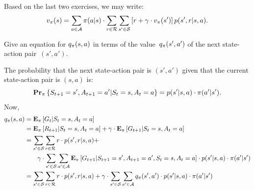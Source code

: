Based on the last two exercises, we may write:
\begin{equation}
    v_{\pi} (s) = \sum_{a \in \mathcal{A}} \pi (a \vert s) \cdot 
            \sum_{r \in \mathcal{R}} \sum_{s' \in \mathcal{S}} \left [ r + \gamma \cdot v_{\pi}(s') \right ] p(s', r \vert s, a).
\end{equation}

\begin{exer}
Give an equation for $q_{\pi} (s, a)$ in terms of the 
value~$q_{\pi} (s', a')$ of the next state-action pair~$(s', a')$. 
\end{exer}
\begin{solution}
The probability that the next state-action pair is $(s', a')$ given 
that the current state-action pair is $(s, a)$ is:
\[
    \mathbf{Pr}_{\pi} \left \{ S_{t + 1} = s', A_{t + 1} = a' \vert S_t = s, A_t = a \right \}
    = p(s' \vert s, a) \cdot \pi (a' \vert s').
\]
Now,
\begin{align*}
    q_{\pi} (s, a) & = \mathbf{E}_{\pi} \left [ G_t \vert S_t = s, A_t = a \right ] \\
                       & = \mathbf{E}_{\pi} \left [ R_{t + 1} \vert S_t = s, A_t = a \right ] + 
                           \gamma \cdot \mathbf{E}_{\pi} \left [ G_{t + 1} \vert S_t = s, A_t = a \right ] \\
                       & = \sum_{s' \in \mathcal{S}} \sum_{r \in \mathcal{R}} r \cdot p(s', r \vert s, a) + \\
                       & \quad \quad \gamma \cdot \sum_{s' \in \mathcal{S}} \sum_{a' \in \mathcal{A}} 
                            \mathbf{E}_{\pi} \left [ G_{t + 1} \vert S_{t + 1} = s', A_{t + 1} = a', S_t = s, A_t = a \right ] \cdot 
                            p(s' \vert s, a) \cdot \pi (a' \vert s')\\
                       & = \sum_{s' \in \mathcal{S}} \sum_{r \in \mathcal{R}} r \cdot p(s', r \vert s, a) + \gamma \cdot 
                           \sum_{s' \in \mathcal{S}} \sum_{a' \in \mathcal{A}} q_{\pi} (s', a') \cdot p(s' \vert s, a) \cdot \pi (a' \vert s')
\end{align*}
\end{solution}
